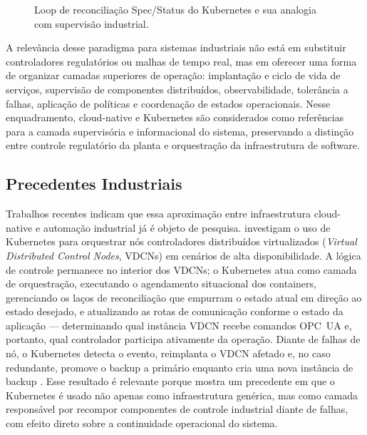 \begin{figure}[htbp]
	\centering
	\caption{Loop de reconciliação Spec/Status do Kubernetes e sua analogia com supervisão industrial.}
	\label{fig:k8s_reconciliation}
\end{figure}

A relevância desse paradigma para sistemas industriais não está em substituir controladores regulatórios ou malhas de tempo real, mas em oferecer uma forma de organizar camadas superiores de operação: implantação e ciclo de vida de serviços, supervisão de componentes distribuídos, observabilidade, tolerância a falhas, aplicação de políticas e coordenação de estados operacionais. Nesse enquadramento, cloud-native e Kubernetes são considerados como referências para a camada supervisória e informacional do sistema, preservando a distinção entre controle regulatório da planta e orquestração da infraestrutura de software.

\subsection{Precedentes Industriais}

Trabalhos recentes indicam que essa aproximação entre infraestrutura cloud-native e automação industrial já é objeto de pesquisa.  investigam o uso de Kubernetes para orquestrar nós controladores distribuídos virtualizados (\textit{Virtual Distributed Control Nodes}, VDCNs) em cenários de alta disponibilidade. A lógica de controle permanece no interior dos VDCNs; o Kubernetes atua como camada de orquestração, executando o agendamento situacional dos containers, gerenciando os laços de reconciliação que empurram o estado atual em direção ao estado desejado, e atualizando as rotas de comunicação conforme o estado da aplicação --- determinando qual instância VDCN recebe comandos OPC~UA e, portanto, qual controlador participa ativamente da operação. Diante de falhas de nó, o Kubernetes detecta o evento, reimplanta o VDCN afetado e, no caso redundante, promove o backup a primário enquanto cria uma nova instância de backup \cite{Johansson2022}. Esse resultado é relevante porque mostra um precedente em que o Kubernetes é usado não apenas como infraestrutura genérica, mas como camada responsável por recompor componentes de controle industrial diante de falhas, com efeito direto sobre a continuidade operacional do sistema.


